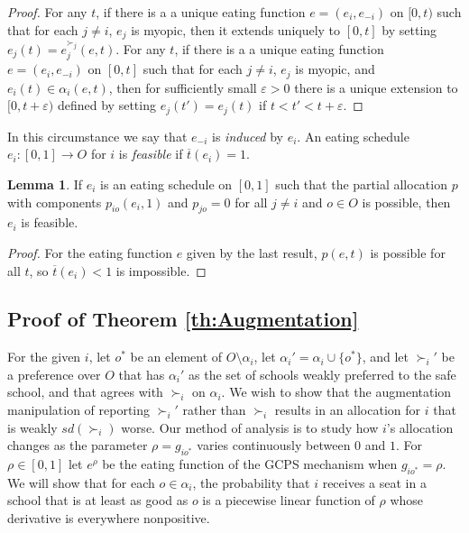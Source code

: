 \documentclass[12pt]{article}
\theoremstyle{definition}
\newtheorem{lem}{Lemma}
\newcommand{\bart}{{\overline t}}
\newcommand{\varep}{\varepsilon}
\begin{document}
\begin{appendix}
\begin{proof}
  For any $t$, if there is a  a unique eating function $e = (e_i,e_{-i})$ on $[0,t)$ such that for each $j \ne i$, $e_j$ is myopic, then it extends uniquely to $[0,t]$ by setting $e_j(t) = e^{\succ_j}_j(e,t)$.  For any $t$, if there is a  a unique eating function $e = (e_i,e_{-i})$ on $[0,t]$ such that for each $j \ne i$, $e_j$ is myopic, and $e_i(t) \in \alpha_i(e,t)$, then for sufficiently small $\varep > 0$ there is a unique extension to $[0,t+\varep)$ defined by setting  $e_j(t') = e_j(t)$ if $t < t' < t + \varep$.
\end{proof}

In this circumstance we say that $e_{-i}$ is \emph{induced} by $e_i$.  An eating schedule $e_i \colon [0,1] \to O$ for $i$ is \emph{feasible} if $\bart(e_i) = 1$.  

\begin{lem} \label{lemma:ExtendEatTwo}
  If $e_i$ is an eating schedule on $[0,1]$ such that the partial allocation $p$ with components $p_{io}(e_i,1)$ and $p_{jo} = 0$ for all $j \ne i$ and $o \in O$ is possible, then $e_i$ is feasible.
\end{lem}

\begin{proof}
  For the eating function $e$ given by the last result, $p(e,t)$ is possible for all $t$, so $\bart(e_i) < 1$ is impossible.
\end{proof}

\subsection{Proof of Theorem \ref{th:Augmentation}}

For the given $i$, let $o^*$ be an element of $O \setminus \alpha_i$, let $\alpha_i' = \alpha_i \cup \{o^*\}$, and let $\succ_i'$ be a preference over $O$ that has $\alpha_i'$ as the set of schools weakly preferred to the safe school, and that
agrees with $\succ_i$ on $\alpha_i$.  We wish to show that the augmentation manipulation of reporting $\succ_i'$ rather than $\succ_i$ results in an allocation for $i$ that is weakly $sd(\succ_i)$ worse. 
Our method of analysis is to study how $i$'s allocation changes as  the parameter $\rho = g_{io^*}$ varies continuously between $0$ and $1$.  For $\rho \in [0,1]$ let $e^\rho$ be the eating function of the GCPS mechanism when $g_{io^*} = \rho$.  We will show that for each $o \in \alpha_i$, the probability that $i$ receives a seat in a school that is at least as good as $o$ is a piecewise linear function of $\rho$ whose derivative is everywhere nonpositive.


\end{appendix}
\end{document}
